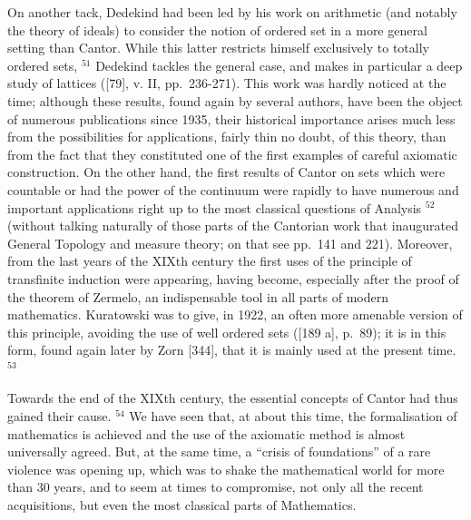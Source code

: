 On another tack, Dedekind had been led by his work on arithmetic (and notably the theory of ideals) to consider the notion of ordered set in a more general setting than Cantor. While this latter restricts himself exclusively to totally ordered sets, \(^{51}\) Dedekind tackles the general case, and makes in particular a deep study of lattices ({[}79{]}, v. II, pp.~236-271). This work was hardly noticed at the time; although these results, found again by several authors, have been the object of numerous publications since 1935, their historical importance arises much less from the possibilities for applications, fairly thin no doubt, of this theory, than from the fact that they constituted one of the first examples of careful axiomatic construction. On the other hand, the first results of Cantor on sets which were countable or had the power of the continuum were rapidly to have numerous and important applications right up to the most classical questions of Analysis \(^{52}\) (without talking naturally of those parts of the Cantorian work that inaugurated General Topology and measure theory; on that see pp.~141 and 221). Moreover, from the last years of the XIXth century the first uses of the principle of transfinite induction were appearing, having become, especially after the proof of the theorem of Zermelo, an indispensable tool in all parts of modern mathematics. Kuratowski was to give, in 1922, an often more amenable version of this principle, avoiding the use of well ordered sets ({[}189 a{]}, p.~89); it is in this form, found again later by Zorn {[}344{]}, that it is mainly used at the present time. \(^{53}\)

Towards the end of the XIXth century, the essential concepts of Cantor had thus gained their cause. \(^{54}\) We have seen that, at about this time, the formalisation of mathematics is achieved and the use of the axiomatic method is almost universally agreed. But, at the same time, a ``crisis of foundations'' of a rare violence was opening up, which was to shake the mathematical world for more than 30 years, and to seem at times to compromise, not only all the recent acquisitions, but even the most classical parts of Mathematics.

